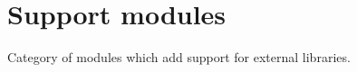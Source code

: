 \hypertarget{group___support__modules}{}\section{Support modules}
\label{group___support__modules}
Category of modules which add support for external libraries. 